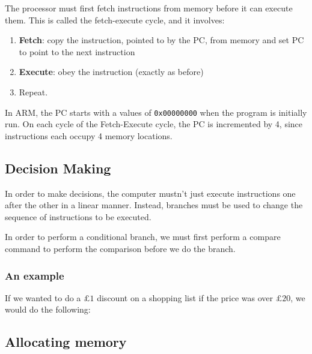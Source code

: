 The processor must first fetch instructions from memory before it can execute
them. This is called the fetch-execute cycle, and it involves:

\begin{enumerate}     \item \textbf{Fetch}: copy the instruction, pointed to by
the PC, from memory and set PC to point to the next instruction     \item
\textbf{Execute}:  obey the instruction (exactly as before)     \item Repeat.
\end{enumerate}

In ARM, the PC starts with a values of \texttt{0x00000000} when the program is
initially run. On each cycle of the Fetch-Execute cycle, the PC is incremented
by 4, since instructions each occupy 4 memory locations.

\subsection{Decision Making}

In order to make decisions, the computer mustn't just execute instructions one
after the other in a linear manner. Instead, branches must be used to change the
sequence of instructions to be executed.

In order to perform a conditional branch, we must first perform a compare
command to perform the comparison before we do the branch.

\subsubsection{An example}

If we wanted to do a $£1$ discount on a shopping list if the price was over
$£20$, we would do the following:


\subsection{Allocating memory}

